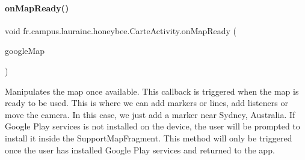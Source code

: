 \paragraph{\texorpdfstring{on\+Map\+Ready()}{onMapReady()}}
{\footnotesize\ttfamily void fr.\+campus.\+laurainc.\+honeybee.\+Carte\+Activity.\+on\+Map\+Ready (\begin{DoxyParamCaption}\item[{Google\+Map}]{google\+Map }\end{DoxyParamCaption})}

Manipulates the map once available. This callback is triggered when the map is ready to be used. This is where we can add markers or lines, add listeners or move the camera. In this case, we just add a marker near Sydney, Australia. If Google Play services is not installed on the device, the user will be prompted to install it inside the Support\+Map\+Fragment. This method will only be triggered once the user has installed Google Play services and returned to the app. 
